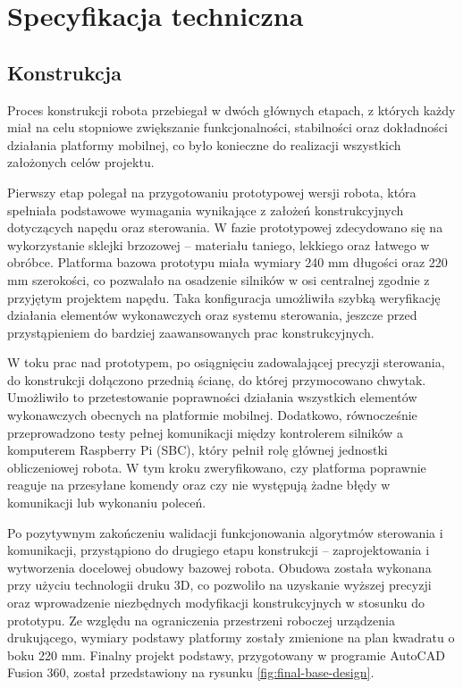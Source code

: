 \chapter{Specyfikacja techniczna}
\label{ch:06}

\section{Konstrukcja}
Proces konstrukcji robota przebiegał w dwóch głównych etapach, z których każdy miał na celu stopniowe zwiększanie funkcjonalności, stabilności oraz dokładności działania platformy mobilnej, co było konieczne do realizacji wszystkich założonych celów projektu.

Pierwszy etap polegał na przygotowaniu prototypowej wersji robota, która spełniała podstawowe wymagania wynikające z założeń konstrukcyjnych dotyczących napędu oraz sterowania. W fazie prototypowej zdecydowano się na wykorzystanie sklejki brzozowej – materiału taniego, lekkiego oraz łatwego w obróbce. Platforma bazowa prototypu miała wymiary 240 mm długości oraz 220 mm szerokości, co pozwalało na osadzenie silników w osi centralnej zgodnie z przyjętym projektem napędu. Taka konfiguracja umożliwiła szybką weryfikację działania elementów wykonawczych oraz systemu sterowania, jeszcze przed przystąpieniem do bardziej zaawansowanych prac konstrukcyjnych.

W toku prac nad prototypem, po osiągnięciu zadowalającej precyzji sterowania, do konstrukcji dołączono przednią ścianę, do której przymocowano chwytak. Umożliwiło to przetestowanie poprawności działania wszystkich elementów wykonawczych obecnych na platformie mobilnej. Dodatkowo, równocześnie przeprowadzono testy pełnej komunikacji między kontrolerem silników a komputerem Raspberry Pi (SBC), który pełnił rolę głównej jednostki obliczeniowej robota. W tym kroku zweryfikowano, czy platforma poprawnie reaguje na przesyłane komendy oraz czy nie występują żadne błędy w komunikacji lub wykonaniu poleceń.

Po pozytywnym zakończeniu walidacji funkcjonowania algorytmów sterowania i komunikacji, przystąpiono do drugiego etapu konstrukcji – zaprojektowania i wytworzenia docelowej obudowy bazowej robota. Obudowa została wykonana przy użyciu technologii druku 3D, co pozwoliło na uzyskanie wyższej precyzji oraz wprowadzenie niezbędnych modyfikacji konstrukcyjnych w stosunku do prototypu. Ze względu na ograniczenia przestrzeni roboczej urządzenia drukującego, wymiary podstawy platformy zostały zmienione na plan kwadratu o boku 220 mm. Finalny projekt podstawy, przygotowany w programie AutoCAD Fusion 360, został przedstawiony na rysunku \ref{fig:final-base-design}.

